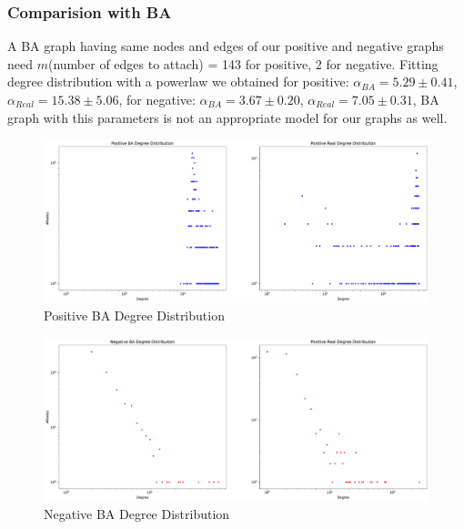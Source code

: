 \documentclass[sigchi]{acmart}
\begin{document}
\subsubsection{Comparision with BA}
A BA graph having same nodes and edges of our positive and negative graphs need $m$(number of edges to attach) = 143 for positive, 2 for negative. Fitting degree distribution with a powerlaw we obtained for positive: $\alpha_{BA} = 5.29 \pm 0.41$, $\alpha_{Real} = 15.38 \pm 5.06$, for negative: $\alpha_{BA} = 3.67 \pm 0.20$, $\alpha_{Real} = 7.05 \pm 0.31$, BA graph with this parameters is not an appropriate model for our graphs as well.
\begin{figure}[h]
	\centering
	\includegraphics[width=\linewidth]{plot/ba_comparison_positive.pdf}
	\caption{Positive BA Degree Distribution}
\end{figure}
\begin{figure}[h]
	\centering
	\includegraphics[width=\linewidth]{plot/ba_comparison_negative.pdf}
	\caption{Negative BA Degree Distribution}
\end{figure}
\end{document}
